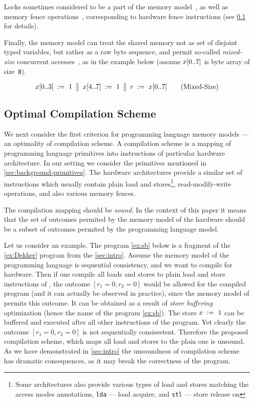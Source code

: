 Locks sometimes considered to be a part 
of the memory model~\cite{Manson-al:POPL05}, 
as well as memory fence operations~\cite{Batty-al:POPL11},
corresponding to hardware fence instructions
(see \cref{sec:background-compile} for details). 

Finally, the memory model can treat the shared memory 
not as set of disjoint typed variables, but rather as 
a raw byte sequence, and permit so-called \emph{mixed-size} 
concurrent accesses~\cite{Flur-al:POPL17}, as in the example below 
(assume $x[0..7]$ is byte array of size~\texttt{8}). 

\begin{align*}
\inarrIII{
  \writeArrayInst{}{x}{1}{0}{3}
}{
  \writeArrayInst{}{x}{1}{4}{7}
}{
  \readArrayInst{}{r}{x}{0}{7}
}
\tag{Mixed-Size}\label{ex:mixsz}
\end{align*}

\subsection{Optimal Compilation Scheme}
\label{sec:background-compile}

We next consider the first criterion for 
programming language memory models --- 
an optimality of compilation scheme. 
A compilation scheme is a mapping of 
programming language primitives into 
instructions of particular hardware architecture. 
In our setting we consider the primitives 
mentioned in \cref{sec:background-primitives}.
The hardware architectures provide a similar set 
of instructions which usually contain 
plain load and stores\footnote{Some architectures 
also provide various types of load and stores
matching the access modes annotations, 
\eg \texttt{lda} --- load acquire, 
and \texttt{stl} --- store release on }, 
read-modify-write operations, 
and also various memory fences.    

The compilation mapping should be \emph{sound}.
In the context of this paper it means that 
the set of outcomes permited by the 
memory model of the hardware should be 
a subset of outcomes permited by the 
programming language model. 

Let us consider an example. 
The program \ref{ex:sb} below is a 
fragment of the \ref{ex:Dekker} program 
from the \cref{sec:intro}.
Assume the memory model of the programming language
is sequential consistency, and we want 
to compile for \xTSO hardware. 
Then if one compile all loads and stores 
to plain load and store instructions of \xTSO,
the outcome $[r_1=0, r_2=0]$ would be 
allowed for the compiled program 
(and it can actually be observed in practice), 
since the memory model of \xTSO permits this outcome. 
It can be obtained as a result of \emph{store buffering}
optimization (hence the name of the program \ref{ex:sb}). 
The store $x\;:=_{}\;1$ can be buffered and 
executed after all other instructions of the program.  
Yet clearly the outcome $[r_1=0, r_2=0]$ is not sequentially consisestent. 
Therefore the proposed compilation scheme, 
which maps all load and stores to the plain one is unsound. 
As we have demonstrated in \cref{sec:intro} 
the unsoundness of compilation scheme has 
dramatic consequences, as it may break 
the correctness of the program. 

